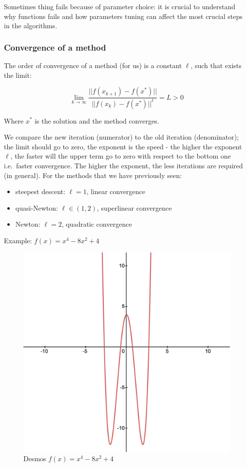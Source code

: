 Sometimes thing fails because of parameter choice: it is crucial to
understand why functions fails and how parameters tuning can affect the
most crucial steps in the algorithms.

\hypertarget{convergence-of-a-method}{%
\subsubsection{Convergence of a method}\label{convergence-of-a-method}}

The order of convergence of a method (for us) is a constant $\ell$, such
that exists the limit:

$$
\lim_{k \rightarrow \infty  }\frac{||f(x_{k+1})-f(x^*)||}{||f(x_{k})-f(x^*)||^\ell} = L >0
$$

Where $x^*$ is the solution and the method converges.

We compare the new iteration (numerator) to the old iteration
(denominator); the limit should go to zero, the exponent is the speed -
the higher the exponent $\ell$, the faster will the upper term go to
zero with respect to the bottom one i.e.~faster convergence. The higher
the exponent, the less iterations are required (in general). For the
methods that we have previously seen:

\begin{itemize}
\tightlist
\item
  steepest descent: $\ell=1$, linear convergence
\item
  quasi-Newton: $\ell \in (1,2)$, superlinear convergence
\item
  Newton: $\ell=2$, quadratic convergence
\end{itemize}

Example: $f(x)=x^4-8x^2+4$

\begin{figure}
\centering
\includegraphics{function.png}
\caption{Desmos  $f(x)=x^4-8x^2+4$}
\end{figure}

